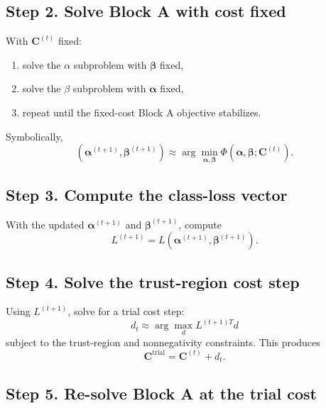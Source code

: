 \documentclass[11pt]{article}
\newcommand{\betavec}{\boldsymbol{\beta}}
\newcommand{\alphavec}{\boldsymbol{\alpha}}
\newcommand{\costvec}{\mathbf{C}}
\begin{document}
\subsection*{Step 2. Solve Block A with cost fixed}

With $\costvec^{(t)}$ fixed:
\begin{enumerate}
  \item solve the $\alpha$ subproblem with $\betavec$ fixed,
  \item solve the $\beta$ subproblem with $\alphavec$ fixed,
  \item repeat until the fixed-cost Block A objective stabilizes.
\end{enumerate}

Symbolically,
\begin{equation}
\label{eq:block-a-solve}
(\alphavec^{(t+1)}, \betavec^{(t+1)})
\approx
\arg\min_{\alphavec, \betavec}
\Phi(\alphavec, \betavec; \costvec^{(t)}).
\end{equation}

\subsection*{Step 3. Compute the class-loss vector}

With the updated $\alphavec^{(t+1)}$ and $\betavec^{(t+1)}$, compute
\begin{equation}
\label{eq:class-loss-step}
L^{(t+1)}
=
L(\alphavec^{(t+1)}, \betavec^{(t+1)}).
\end{equation}

\subsection*{Step 4. Solve the trust-region cost step}

Using $L^{(t+1)}$, solve for a trial cost step:
\begin{equation}
\label{eq:cost-step}
d_t
\approx
\arg\max_d L^{(t+1)T} d
\end{equation}
subject to the trust-region and nonnegativity constraints. This produces
\begin{equation}
\label{eq:trial-cost-step}
\costvec^{\mathrm{trial}} = \costvec^{(t)} + d_t.
\end{equation}

\subsection*{Step 5. Re-solve Block A at the trial cost}
\end{document}

